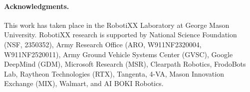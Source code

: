 \paragraph{Acknowledgments.}
This work has taken place in the RobotiXX Laboratory at George Mason University. RobotiXX research is supported by National Science Foundation (NSF, 2350352), Army Research Office (ARO, W911NF2320004, W911NF2520011), Army Ground Vehicle Systems Center (GVSC), Google DeepMind (GDM), Microsoft Research (MSR), Clearpath Robotics, FrodoBots Lab, Raytheon Technologies (RTX), Tangenta, 4-VA, Mason Innovation Exchange (MIX), Walmart, and AI BOKI Robotics. 
